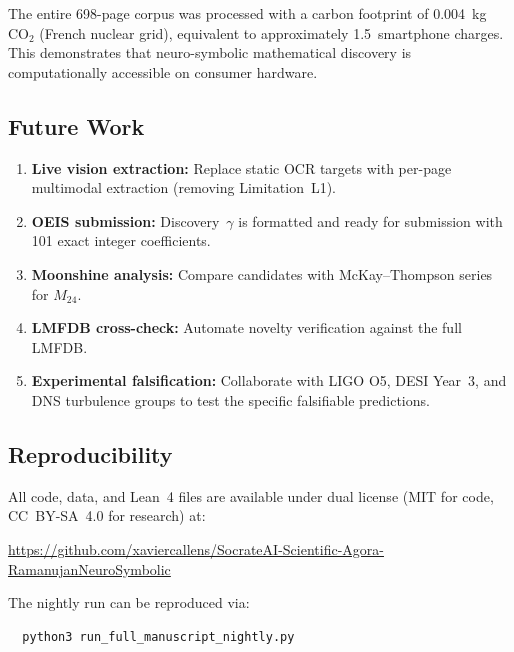 The entire 698-page corpus was processed with a carbon footprint of 0.004~kg CO$_2$ (French nuclear grid), equivalent to approximately 1.5~smartphone charges. This demonstrates that neuro-symbolic mathematical discovery is computationally accessible on consumer hardware.

\subsection{Future Work}

\begin{enumerate}
  \item \textbf{Live vision extraction:} Replace static OCR targets with per-page multimodal extraction (removing Limitation~L1).
  \item \textbf{OEIS submission:} Discovery~$\gamma$ is formatted and ready for submission with 101 exact integer coefficients.
  \item \textbf{Moonshine analysis:} Compare candidates with McKay--Thompson series for $M_{24}$.
  \item \textbf{LMFDB cross-check:} Automate novelty verification against the full LMFDB.
  \item \textbf{Experimental falsification:} Collaborate with LIGO O5, DESI Year~3, and DNS turbulence groups to test the specific falsifiable predictions.
\end{enumerate}

\subsection{Reproducibility}

All code, data, and Lean~4 files are available under dual license (MIT for code, CC~BY-SA~4.0 for research) at:
\begin{center}
\url{https://github.com/xaviercallens/SocrateAI-Scientific-Agora-RamanujanNeuroSymbolic}
\end{center}
The nightly run can be reproduced via:
\begin{verbatim}
  python3 run_full_manuscript_nightly.py
\end{verbatim}
